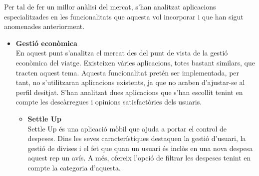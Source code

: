 Per tal de fer un millor anàlisi del mercat, s'han analitzat aplicacions especialitzades en les funcionalitats que aquesta vol incorporar i que han sigut anomenades anteriorment.

\begin{itemize}
\item{\textbf{Gestió econòmica}}\\
En aquest punt s'analitza el mercat des del punt de vista de la gestió econòmica del viatge. Existeixen vàries aplicacions, totes bastant similars, que tracten aquest tema.
Aquesta funcionalitat pretén ser implementada, per tant, no s'utilitzaran aplicacions existents, ja que no acaben d'ajustar-se al perfil desitjat.
S'han analitzat dues aplicacions que s'han escollit tenint en compte les descàrregues i opinions satisfactòries dels usuaris.
\begin{itemize}
\item{\textbf{Settle Up}}\\
Settle Up és una aplicació mòbil que ajuda a portar el control de despeses. Dins les seves característiques destaquen la gestió d'usuari, la gestió de divises i el fet que quan un usuari és inclòs en una nova despesa aquest rep un avís. A més, ofereix l'opció de filtrar les despeses tenint en compte la categoria d'aquesta.


\end{itemize}
\end{itemize}
